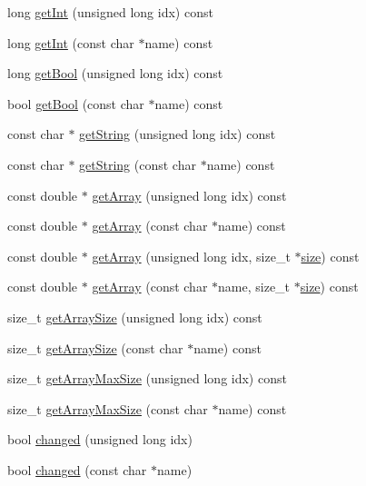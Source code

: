 \begin{DoxyCompactItemize}
\item 
long \hyperlink{class_frame_lib___parameters_adc9dcbcbf2ac23f0e15a35db8090aa88}{get\+Int} (unsigned long idx) const
\item 
long \hyperlink{class_frame_lib___parameters_a31833d0ce833197dbde6346159bf3222}{get\+Int} (const char $\ast$name) const
\item 
long \hyperlink{class_frame_lib___parameters_ad27a46c31a31f42a6efb7c29c6937595}{get\+Bool} (unsigned long idx) const
\item 
bool \hyperlink{class_frame_lib___parameters_adb0e6fa234026a2cd72eb5baed059b30}{get\+Bool} (const char $\ast$name) const
\item 
const char $\ast$ \hyperlink{class_frame_lib___parameters_a9853e712e3ee11410175d6e3028d862a}{get\+String} (unsigned long idx) const
\item 
const char $\ast$ \hyperlink{class_frame_lib___parameters_acee2bbf4822572b7b37447462f50c44b}{get\+String} (const char $\ast$name) const
\item 
const double $\ast$ \hyperlink{class_frame_lib___parameters_adc277fde0bbaa9250076b58efc9428e6}{get\+Array} (unsigned long idx) const
\item 
const double $\ast$ \hyperlink{class_frame_lib___parameters_a4a5ff203e9384ca2fb73b7589a6de74e}{get\+Array} (const char $\ast$name) const
\item 
const double $\ast$ \hyperlink{class_frame_lib___parameters_a645085b04512fadc95ff59b910954bdc}{get\+Array} (unsigned long idx, size\+\_\+t $\ast$\hyperlink{class_frame_lib___parameters_a391d0cb37c904981f7ad52bc0ba1b111}{size}) const
\item 
const double $\ast$ \hyperlink{class_frame_lib___parameters_a09126c9d1be171bde88fe171944bc038}{get\+Array} (const char $\ast$name, size\+\_\+t $\ast$\hyperlink{class_frame_lib___parameters_a391d0cb37c904981f7ad52bc0ba1b111}{size}) const
\item 
size\+\_\+t \hyperlink{class_frame_lib___parameters_a393371aad3079281d84150f9343b8e88}{get\+Array\+Size} (unsigned long idx) const
\item 
size\+\_\+t \hyperlink{class_frame_lib___parameters_a6aab87bc340522a457d3275728d6ad69}{get\+Array\+Size} (const char $\ast$name) const
\item 
size\+\_\+t \hyperlink{class_frame_lib___parameters_ac65d6b2f5cee3b3c95b321c67de6fadb}{get\+Array\+Max\+Size} (unsigned long idx) const
\item 
size\+\_\+t \hyperlink{class_frame_lib___parameters_aa471582edb55bbb44146a560228821ef}{get\+Array\+Max\+Size} (const char $\ast$name) const
\item 
bool \hyperlink{class_frame_lib___parameters_a1ddc66de3c5b22c98c61692139d6edb1}{changed} (unsigned long idx)
\item 
bool \hyperlink{class_frame_lib___parameters_a6bd6af480a8d8f589ee7443c690f75b0}{changed} (const char $\ast$name)
\end{DoxyCompactItemize}


